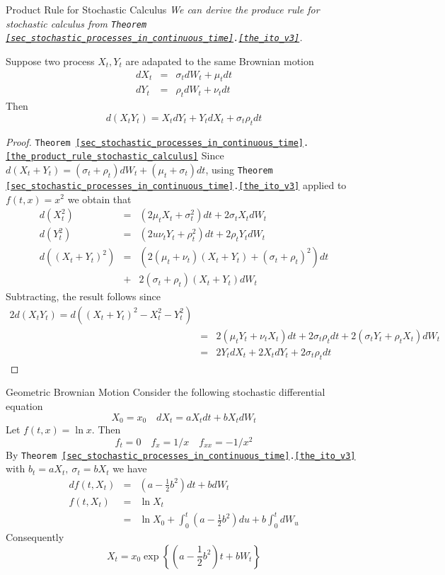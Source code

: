 \documentclass[11pt,a4paper]{article}
\begin{document}
  \begin{theorem}{Product Rule for Stochastic Calculus}\label{the_product_rule_stochastic_calculus}
    \textit{We can derive the produce rule for stochastic calculus from \texttt{Theorem \ref{sec_stochastic_processes_in_continuous_time}.\ref{the_ito_v3}}.}
    \par Suppose two process $X_t,Y_t$ are adapated to the same Brownian motion
    \[\begin{array}{rcl}
      dX_t&=&\sigma_tdW_t+\mu_tdt\\
      dY_t&=&\rho_tdW_t+\nu_tdt
    \end{array}\]
    Then
    \[ d(X_tY_t)=X_tdY_t+Y_tdX_t+\sigma_t\rho_tdt \]
  \end{theorem}

  \begin{proof}{\texttt{Theorem \ref{sec_stochastic_processes_in_continuous_time}.\ref{the_product_rule_stochastic_calculus}}}
    Since $d(X_t+Y_t)=(\sigma_t+\rho_t)dW_t+(\mu_t+\sigma_t)dt$, using \texttt{Theorem \ref{sec_stochastic_processes_in_continuous_time}.\ref{the_ito_v3}} applied to $f(t,x)=x^2$ we obtain that
    \[\begin{array}{rcl}
      d(X_t^2)&=&(2\mu_tX_t+\sigma_t^2)dt+2\sigma_tX_tdW_t\\
      d(Y_t^2)&=&(2u\nu_tY_t+\rho_t^2)dt+2\rho_tY_tdW_t\\
      d((X_t+Y_t)^2)&=&(2(\mu_t+\nu_t)(X_t+Y_t)+(\sigma_t+\rho_t)^2)dt\\
      &+&2(\sigma_t+\rho_t)(X_t+Y_t)dW_t
    \end{array}\]
    Subtracting, the result follows since
    \[\begin{array}{rcl}
      2d(X_tY_t)=d((X_t+Y_t)^2-X_t^2-Y_t^2)\\
      &=&2(\mu_tY_t+\nu_tX_t)dt+2\sigma_t\rho_tdt+2(\sigma_tY_t+\rho_tX_t)dW_t\\
      &=&2Y_tdX_t+2X_tdY_t+2\sigma_t\rho_tdt
    \end{array}\]
  \end{proof}

  \begin{example}{Geometric Brownian Motion}
    Consider the following stochastic differential equation
    \[ X_0=x_0\quad dX_t=aX_tdt+bX_tdW_t \]
    Let $f(t,x)=\ln x$. Then
    \[ f_t=0\quad f_x=1/x\quad f_{xx}=-1/x^2 \]
    By \texttt{Theorem \ref{sec_stochastic_processes_in_continuous_time}.\ref{the_ito_v3}} with $b_t=aX_t,\ \sigma_t=bX_t$ we have
    \[\begin{array}{rcl}
      df(t,X_t)&=&\left(a-\frac12b^2\right)dt+bdW_t\\
      f(t,X_t)&=&\ln X_t\\
      &=&\ln X_0+\int_0^t\left(a-\frac12b^2\right)du+b\int_0^tdW_u
    \end{array}\]
    Consequently
    \[ X_t=x_0\exp\left\{\left(a-\frac12b^2\right)t+bW_t\right\} \]
  \end{example}
\end{document}

